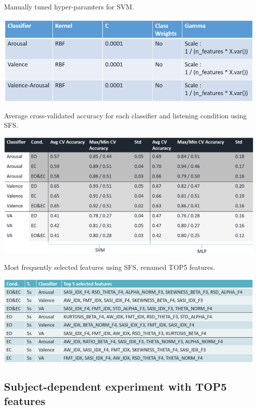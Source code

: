\begin{table}[h!]
  \caption{Manually tuned hyper-paramters for SVM.}
  \label{tbl:svm_initial_parameters}
  \includegraphics[width=\linewidth]{img/appendix/svm_initial_parameters.png}
\end{table}

\begin{table}[h!]
  \caption{Average cross-validated accuracy for each classifier and listening condition using SFS.}
  \label{tbl:sfs_cv_experiment}
  \includegraphics[width=\linewidth]{img/appendix/sfs_cv_experiment.png}
\end{table}

\begin{table}[h!]
  \caption{Most frequently selected features using SFS, renamed TOP5 features.}
  \label{tbl:sfs_features}
  \includegraphics[width=\linewidth]{img/appendix/sfs_features.png}
\end{table}


\subsection{Subject-dependent experiment with TOP5 features}
\label{sec:appendix_A3.2}


